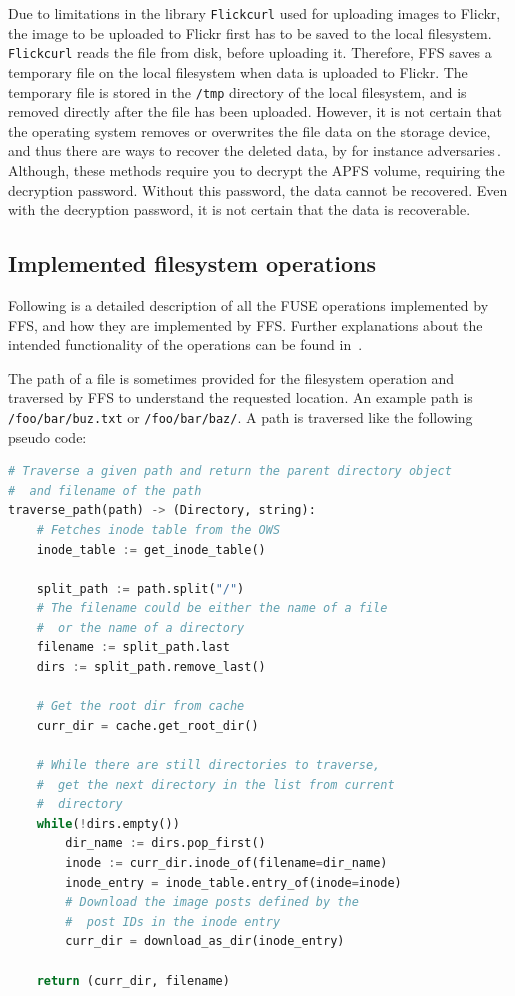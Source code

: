 Due to limitations in the library \texttt{Flickcurl} used for uploading images to Flickr, the image to be uploaded to Flickr first has to be saved to the local filesystem. \texttt{Flickcurl} reads the file from disk, before uploading it. Therefore, FFS saves a temporary file on the local filesystem when data is uploaded to Flickr. The temporary file is stored in the \texttt{/tmp} directory of the local filesystem, and is removed directly after the file has been uploaded. However, it is not certain that the operating system removes or overwrites the file data on the storage device, and thus there are ways to recover the deleted data, by for instance adversaries\,\cite{llcsysdevlaboratoriesHowRecoverData2022,cedricAPFSDataRecovery2022,santosHowRecoverData2021}. Although, these methods require you to decrypt the APFS volume, requiring the decryption password. Without this password, the data cannot be recovered. Even with the decryption password, it is not certain that the data is recoverable.

\subsection{Implemented filesystem operations}
\label{subsec:file_op}
Following is a detailed description of all the FUSE operations implemented by FFS, and how they are implemented by FFS. Further explanations about the intended functionality of the operations can be found in \,\cite{kuenningCS135FUSEDocumentation2010}. 

The path of a file is sometimes provided for the filesystem operation and traversed by FFS to understand the requested location. An example path is \texttt{/foo/bar/buz.txt} or \texttt{/foo/bar/baz/}. A path is traversed like the following pseudo code:
\begin{lstlisting}[language=python, caption={Pseudocode of traversing a given path, returning the \texttt{Directory} and the filename}, label=lst:traverse_path,breaklines=true]
# Traverse a given path and return the parent directory object
#  and filename of the path
traverse_path(path) -> (Directory, string):
	# Fetches inode table from the OWS
	inode_table := get_inode_table()
	
	split_path := path.split("/")
	# The filename could be either the name of a file 
	#  or the name of a directory
	filename := split_path.last
	dirs := split_path.remove_last()

	# Get the root dir from cache
	curr_dir = cache.get_root_dir()

	# While there are still directories to traverse,
	#  get the next directory in the list from current
	#  directory
	while(!dirs.empty())
		dir_name := dirs.pop_first()
		inode := curr_dir.inode_of(filename=dir_name)
		inode_entry = inode_table.entry_of(inode=inode)
		# Download the image posts defined by the 
		#  post IDs in the inode entry
		curr_dir = download_as_dir(inode_entry)
	
	return (curr_dir, filename)

\end{lstlisting}

